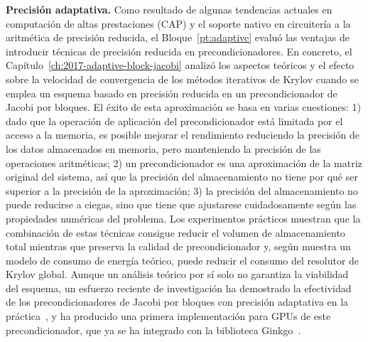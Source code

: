 \noindent\textbf{Precisión adaptativa.}
Como resultado de algunas tendencias actuales en computación de altas
prestaciones (CAP) y el soporte nativo en circuitería a la aritmética de
precisión reducida, el Bloque~\ref{pt:adaptive} evaluó las ventajas de
introducir técnicas de precisión reducida en precondicionadores.  En concreto,
el Capítulo~\ref{ch:2017-adaptive-block-jacobi} analizó los aspectos teóricos y
el efecto sobre la velocidad de convergencia de los métodos iterativos de Krylov
cuando se emplea un esquema basado en precisión reducida en un precondicionador
de Jacobi por bloques. El éxito de esta aproximación se basa en varias
cuestiones: 1) dado que la operación de aplicación del precondicionador está
limitada por el acceso a la memoria, es posible mejorar el rendimiento
reduciendo la precisión de los datos almacenados en memoria, pero manteniendo la
precisión de las operaciones aritméticas; 2) un precondicionador es una
aproximación de la matriz original del sistema, así que la precisión del
almacenamiento no tiene por qué ser superior a la precisión de la aproximación;
3) la precisión del almacenamiento no puede reducirse a ciegas, sino que tiene
que ajustarese cuidadosamente según las propiedades numéricas del problema. Los
experimentos prácticos muestran que la combinación de estas técnicas consigue
reducir el volumen de almacenamiento total mientras que preserva la calidad de
precondicionador y, según muestra un modelo de consumo de energía teórico, puede
reducir el consumo del resolutor de Krylov global.  Aunque un análisis teórico
por sí solo no garantiza la viabilidad del esquema, un esfuerzo reciente de
investigación ha demostrado la efectividad de los precondicionadores de Jacobi
por bloques con precisión adaptativa en la práctica~\cite{adaptive-jacobi-gpu},
y ha producido una primera implementación para GPUs de este precondicionador,
que ya se ha integrado con la biblioteca Ginkgo~\cite{ginkgo}.

